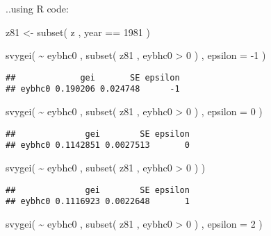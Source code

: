 \documentclass[
]{book}
\newenvironment{Shaded}{\begin{snugshade}}{\end{snugshade}}
\newcommand{\AttributeTok}[1]{\textcolor[rgb]{0.77,0.63,0.00}{#1}}
\newcommand{\DecValTok}[1]{\textcolor[rgb]{0.00,0.00,0.81}{#1}}
\newcommand{\FunctionTok}[1]{\textcolor[rgb]{0.00,0.00,0.00}{#1}}
\newcommand{\NormalTok}[1]{#1}
\newcommand{\OtherTok}[1]{\textcolor[rgb]{0.56,0.35,0.01}{#1}}
\newcommand{\SpecialCharTok}[1]{\textcolor[rgb]{0.00,0.00,0.00}{#1}}
\begin{document}
..using R code:

\begin{Shaded}
\begin{Highlighting}[]
\NormalTok{z81 }\OtherTok{\textless{}{-}} \FunctionTok{subset}\NormalTok{( z , year }\SpecialCharTok{==} \DecValTok{1981}\NormalTok{ )}

\FunctionTok{svygei}\NormalTok{( }\SpecialCharTok{\textasciitilde{}}\NormalTok{ eybhc0 , }\FunctionTok{subset}\NormalTok{( z81 , eybhc0 }\SpecialCharTok{\textgreater{}} \DecValTok{0}\NormalTok{ ) , }\AttributeTok{epsilon =} \SpecialCharTok{{-}}\DecValTok{1}\NormalTok{ )}
\end{Highlighting}
\end{Shaded}

\begin{verbatim}
##             gei       SE epsilon
## eybhc0 0.190206 0.024748      -1
\end{verbatim}

\begin{Shaded}
\begin{Highlighting}[]
\FunctionTok{svygei}\NormalTok{( }\SpecialCharTok{\textasciitilde{}}\NormalTok{ eybhc0 , }\FunctionTok{subset}\NormalTok{( z81 , eybhc0 }\SpecialCharTok{\textgreater{}} \DecValTok{0}\NormalTok{ ) , }\AttributeTok{epsilon =} \DecValTok{0}\NormalTok{ )}
\end{Highlighting}
\end{Shaded}

\begin{verbatim}
##              gei        SE epsilon
## eybhc0 0.1142851 0.0027513       0
\end{verbatim}

\begin{Shaded}
\begin{Highlighting}[]
\FunctionTok{svygei}\NormalTok{( }\SpecialCharTok{\textasciitilde{}}\NormalTok{ eybhc0 , }\FunctionTok{subset}\NormalTok{( z81 , eybhc0 }\SpecialCharTok{\textgreater{}} \DecValTok{0}\NormalTok{ ) )}
\end{Highlighting}
\end{Shaded}

\begin{verbatim}
##              gei        SE epsilon
## eybhc0 0.1116923 0.0022648       1
\end{verbatim}

\begin{Shaded}
\begin{Highlighting}[]
\FunctionTok{svygei}\NormalTok{( }\SpecialCharTok{\textasciitilde{}}\NormalTok{ eybhc0 , }\FunctionTok{subset}\NormalTok{( z81 , eybhc0 }\SpecialCharTok{\textgreater{}} \DecValTok{0}\NormalTok{ ) , }\AttributeTok{epsilon =} \DecValTok{2}\NormalTok{ )}
\end{Highlighting}
\end{Shaded}
\end{document}
